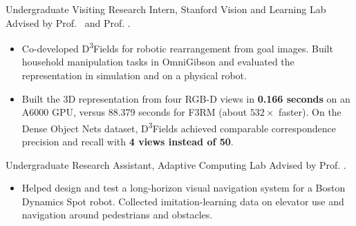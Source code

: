 \entryspace
{}
  {Undergraduate Visiting Research Intern, Stanford Vision and Learning Lab}{}
Advised by Prof. \jiajun\ and Prof. \yunzhu.
\begin{itemize}
  \item Co-developed D\textsuperscript{3}Fields for robotic rearrangement from goal images. Built household manipulation tasks in OmniGibson and evaluated the representation in simulation and on a physical robot.
  \item Built the 3D representation from four RGB-D views in \textbf{0.166 seconds} on an A6000 GPU, versus 88.379 seconds for F3RM (about $532\times$ faster). On the Dense Object Nets dataset, D\textsuperscript{3}Fields achieved comparable correspondence precision and recall with \textbf{4 views instead of 50}.
\end{itemize}
\entryspace
{}
  {Undergraduate Research Assistant, Adaptive Computing Lab}{}
Advised by Prof. \david.
\begin{itemize}
  \item Helped design and test a long-horizon visual navigation system for a Boston Dynamics Spot robot. Collected imitation-learning data on elevator use and navigation around pedestrians and obstacles.
\end{itemize}
